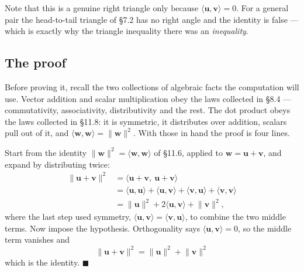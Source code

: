 \documentclass[11pt]{article}
\theoremstyle{definition}
\theoremstyle{remark}
\newcommand{\vc}[1]{\mathbf{#1}}
\newcommand{\norm}[1]{\lVert #1\rVert}
\newcommand{\lattice}[4]{%
  \draw[step=1cm,gray!25,very thin] (#1,#3) grid (#2,#4);
  \draw[axisline] (#1,0) -- (#2+0.45,0) node[right,font=\scriptsize,black]{$x$};
  \draw[axisline] (0,#3) -- (0,#4+0.45) node[above,font=\scriptsize,black]{$y$};
}
\begin{document}
\begin{center}
\end{center}

\noindent Note that this is a genuine right triangle only because
$\langle\vc{u},\vc{v}\rangle=0$. For a general pair the head-to-tail triangle of
\S7.2 has no right angle and the identity is false --- which is exactly why the
triangle inequality there was an \emph{inequality}.

\subsection{The proof}
Before proving it, recall the two collections of algebraic facts the computation
will use. Vector addition and scalar multiplication obey the laws collected in
\S8.4 --- commutativity, associativity, distributivity and the rest. The dot
product obeys the laws collected in \S11.8: it is symmetric, it distributes over
addition, scalars pull out of it, and $\langle\vc{w},\vc{w}\rangle=\norm{\vc{w}}^{2}$.
With those in hand the proof is four lines.

Start from the identity $\norm{\vc{w}}^{2}=\langle\vc{w},\vc{w}\rangle$ of
\S11.6, applied to $\vc{w}=\vc{u}+\vc{v}$, and expand by distributing twice:
\begin{align*}
  \norm{\vc{u}+\vc{v}}^{2}
   &= \bigl\langle \vc{u}+\vc{v},\ \vc{u}+\vc{v} \bigr\rangle \\[2pt]
   &= \langle\vc{u},\vc{u}\rangle + \langle\vc{u},\vc{v}\rangle
      + \langle\vc{v},\vc{u}\rangle + \langle\vc{v},\vc{v}\rangle \\[2pt]
   &= \norm{\vc{u}}^{2} + 2\langle\vc{u},\vc{v}\rangle + \norm{\vc{v}}^{2} ,
\end{align*}
where the last step used symmetry, $\langle\vc{u},\vc{v}\rangle
=\langle\vc{v},\vc{u}\rangle$, to combine the two middle terms. Now impose the
hypothesis. Orthogonality says $\langle\vc{u},\vc{v}\rangle=0$, so the middle
term vanishes and
\[
  \boxed{\;\norm{\vc{u}+\vc{v}}^{2} = \norm{\vc{u}}^{2} + \norm{\vc{v}}^{2}\;}
\]
which is the identity. \hfill$\blacksquare$
\end{document}
